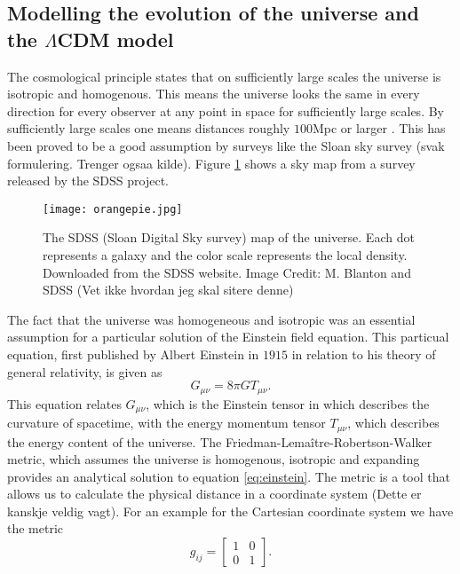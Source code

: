 \subsection{Modelling the evolution of the universe and the $\Lambda$CDM model}
The cosmological principle states that on sufficiently
large scales the universe is isotropic and homogenous. This means the universe
looks the same in every direction for every observer at any point in space for
sufficiently large scales. By sufficiently large scales one means
distances roughly $100$Mpc or larger \cite[p.~12]{ryden2017introduction}. This has been proved to be a good
assumption by surveys like the Sloan sky survey (svak formulering. Trenger ogsaa
kilde). Figure \ref{fig:sdssmap} shows a sky map from a survey released by the
SDSS project.\\
\begin{figure}[htbp]\label{fig:sdssmap}
    \texttt{[image: orangepie.jpg]}
    \caption{The SDSS (Sloan Digital Sky survey) map of the universe. Each dot represents a galaxy and the color scale represents the local density. Downloaded from the SDSS website. Image Credit: M. Blanton and SDSS (Vet ikke hvordan jeg skal sitere denne)}
\end{figure}
The fact that the universe was homogeneous and isotropic was an essential assumption
for a particular solution of the Einstein field equation. 
This particual equation, first published by Albert Einstein in $1915$ \cite{Einstein1915} in relation to his theory of general relativity, is given as
\begin{equation}\label{eq:einstein}
    G_{\mu\nu}=8\pi GT_{\mu\nu}.
\end{equation}
This equation relates $G_{\mu\nu}$, which is the Einstein tensor in which describes the curvature of spacetime, with the energy momentum tensor
$T_{\mu\nu}$, which describes the energy content of the universe.
The Friedman-Lemaître-Robertson-Walker metric, which assumes the universe is
homogenous, isotropic and expanding provides an analytical solution to equation \ref{eq:einstein}.
The metric is a tool that allows us to calculate the physical distance in a coordinate system (Dette er kanskje veldig vagt).
For an example for the Cartesian coordinate system we have the metric 
\begin{equation}
    g_{ij}=
    \begin{bmatrix}
        1 & 0 \\
        0 & 1 
    \end{bmatrix}.
\end{equation}

